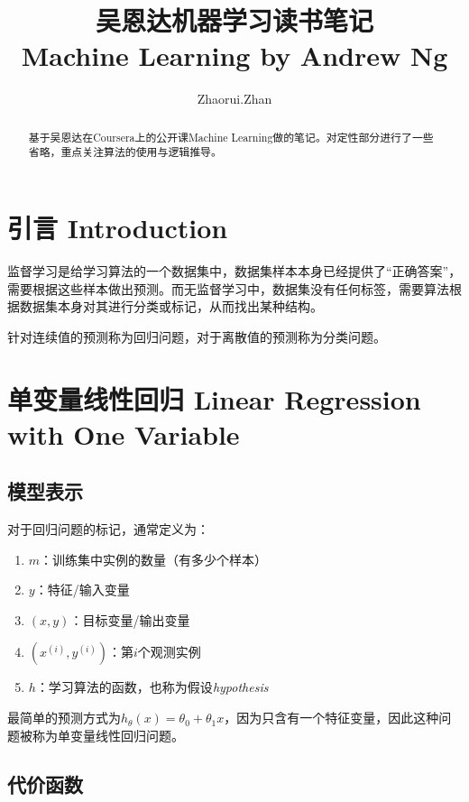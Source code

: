 \documentclass[12pt, a4paper]{article}
\title{吴恩达机器学习读书笔记 \\ Machine Learning by Andrew Ng}
\author{Zhaorui.Zhan}
\date{}
\begin{document}
\maketitle

\begin{abstract}
    基于吴恩达在Coursera上的公开课Machine Learning做的笔记。对定性部分进行了一些省略，重点关注算法的使用与逻辑推导。
\end{abstract}

\tableofcontents
\newpage

\section{引言 Introduction}

监督学习是给学习算法的一个数据集中，数据集样本本身已经提供了“正确答案”，需要根据这些样本做出预测。而无监督学习中，数据集没有任何标签，需要算法根据数据集本身对其进行分类或标记，从而找出某种结构。

针对连续值的预测称为回归问题，对于离散值的预测称为分类问题。

\section{单变量线性回归 Linear Regression with One Variable}

\subsection{模型表示}

对于回归问题的标记，通常定义为：

\begin{enumerate}
    \item
          $m$：训练集中实例的数量（有多少个样本）
    \item
          $y$：特征/输入变量
    \item
          $(x, y)$：目标变量/输出变量
    \item
          $(x^{(i)}, y^{(i)})$：第$i$个观测实例
    \item
          $h$：学习算法的函数，也称为假设\textit{hypothesis}
\end{enumerate}

最简单的预测方式为$h_\theta(x)=\theta_0 + \theta_1x$，因为只含有一个特征变量，因此这种问题被称为单变量线性回归问题。

\subsection{代价函数}
\end{document}
